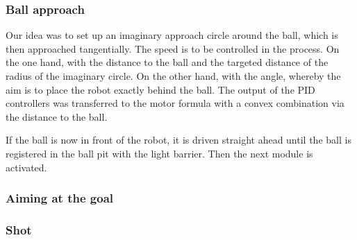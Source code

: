 \subsubsection{Ball approach}
Our idea was to set up an imaginary approach circle around the ball, which is then approached tangentially. The speed is to be controlled in the process. On the one hand, with the distance to the ball and the targeted distance of the radius of the imaginary circle. On the other hand, with the angle, whereby the aim is to place the robot exactly behind the ball. The output of the PID controllers was transferred to the motor formula with a convex combination via the distance to the ball.

If the ball is now in front of the robot, it is driven straight ahead until the ball is registered in the ball pit with the light barrier. Then the next module is activated.

\subsubsection{Aiming at the goal}

\subsubsection{Shot}
